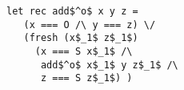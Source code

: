 \begin{figure}[!t]
  \centering
  \begin{minipage}{0.6\columnwidth}
    \begin{lstlisting}[frame=tb]
 let rec add$^o$ x y z = 
   (x === O /\ y === z) \/
   (fresh (x$_1$ z$_1$)
     (x === S x$_1$ /\
      add$^o$ x$_1$ y z$_1$ /\
      z === S z$_1$) )
    \end{lstlisting}
  \end{minipage}
\end{figure}